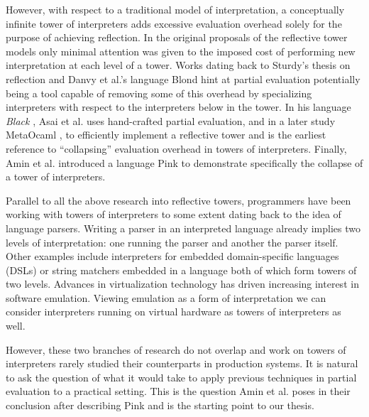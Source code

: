 \documentclass[a4paper,12pt,twoside,openright]{report}
\theoremstyle{definition}
\begin{document}
However, with respect to a traditional model of interpretation, a conceptually infinite tower of interpreters adds excessive evaluation overhead solely for the purpose of achieving reflection. In the original proposals of the reflective tower models only minimal attention was given to the imposed cost of performing new interpretation at each level of a tower. Works dating back to Sturdy's thesis on reflection \cite{sturdy1993lisp} and Danvy et al.'s language Blond \cite{danvy1988intensions} hint at partial evaluation potentially being a tool capable of removing some of this overhead by specializing interpreters with respect to the interpreters below in the tower. In his language \textit{Black} \cite{asai1996duplication}, Asai et al. uses hand-crafted partial evaluation, and in a later study MetaOcaml \cite{asai2015compiling}, to efficiently implement a reflective tower and is the earliest reference to ``collapsing'' evaluation overhead in towers of interpreters. Finally, Amin et al. introduced a language Pink \cite{amin2017collapsing} to demonstrate specifically the collapse of a tower of interpreters.

Parallel to all the above research into reflective towers, programmers have been working with towers of interpreters to some extent dating back to the idea of language parsers. Writing a parser in an interpreted language already implies two levels of interpretation: one running the parser and another the parser itself. Other examples include interpreters for embedded domain-specific languages (DSLs) or string matchers embedded in a language both of which form towers of two levels. Advances in virtualization technology has driven increasing interest in software emulation. Viewing emulation as a form of interpretation we can consider interpreters running on virtual hardware as towers of interpreters as well.

However, these two branches of research do not overlap and work on towers of interpreters rarely studied their counterparts in production systems. It is natural to ask the question of what it would take to apply previous techniques in partial evaluation to a practical setting. This is the question Amin et al. poses in their conclusion after describing Pink \cite{amin2017collapsing} and is the starting point to our thesis.
\end{document}

